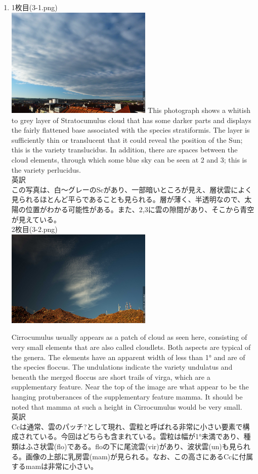 \documentclass{jsarticle}
\newenvironment{problems}
{
  \renewcommand\labelenumi{\doublebox{\arabic{enumi}}}
  \begin{enumerate}
}{
  \end{enumerate}
  \renewcommand\labelenumi{\arabic{enumi}.}
}
\begin{document}
\begin{problems}
\item 
1枚目(3-1.png)\\
\includegraphics[width=7cm]{3-1.png}
This photograph shows a whitish to grey layer of Stratocumulus cloud that has some darker parts and displays the fairly flattened base associated with the species stratiformis. The layer is sufficiently thin or translucent that it could reveal the position of the Sun; this is the variety translucidus. In addition, there are spaces between the cloud elements, through which some blue sky can be seen at 2 and 3; this is the variety perlucidus.
\\英訳\\
この写真は、白〜グレーのScがあり、一部暗いところが見え、層状雲によく見られるほとんど平らであることも見られる。層が薄く、半透明なので、太陽の位置がわかる可能性がある。また、2,3に雲の隙間があり、そこから青空が見えている。
\\
2枚目(3-2.png)\\
\includegraphics[width=7cm]{3-2.png}

Cirrocumulus usually appears as a patch of cloud as seen here, consisting of very small elements that are also called cloudlets. Both aspects are typical of the genera. The elements have an apparent width of less than 1° and are of the species floccus. The undulations indicate the variety undulatus and beneath the merged floccus are short trails of virga, which are a supplementary feature. Near the top of the image are what appear to be the hanging protuberances of the supplementary feature mamma. It should be noted that mamma at such a height in Cirrocumulus would be very small. 
\\英訳\\
Ccは通常、雲のパッチ?として現れ、雲粒と呼ばれる非常に小さい要素で構成されている。今回はどちらも含まれている。雲粒は幅が1°未満であり、種類はふさ状雲(flo)である。floの下に尾流雲(vir)があり、波状雲(un)も見られる。画像の上部に乳房雲(mam)が見られる。なお、この高さにあるCcに付属するmamは非常に小さい。
\end{problems}
\end{document}
